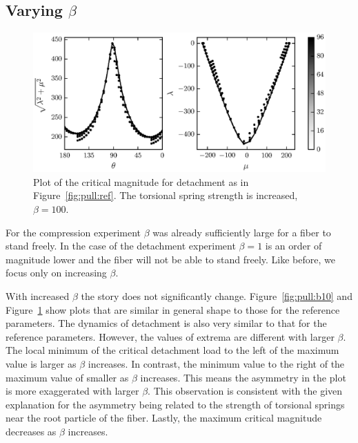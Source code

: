 \subsection{Varying $\beta$}

   \begin{figure}[t]
      \begin{center}
         \includegraphics{./fig/ch3/pull/b100/grid.eps}
      \end{center}      
      \caption{Plot of the critical magnitude for detachment as in Figure~\ref{fig:pull:ref}. The torsional spring strength is increased, $\beta=100$.
      \label{fig:pull:b100}}
   \end{figure}

For the compression experiment $\beta$ was already sufficiently large for a fiber to stand freely. In the case of the detachment experiment $\beta=1$ is an order of magnitude lower and the fiber will not be able to stand freely. Like before, we focus only on increasing $\beta$.

With increased $\beta$ the story does not significantly change. Figure~\ref{fig:pull:b10} and Figure~\ref{fig:pull:b100} show plots that are similar in general shape to those for the reference parameters. The dynamics of detachment is also very similar to that for the reference parameters. However, the values of extrema are different with larger $\beta$. The local minimum of the critical detachment load to the left of the maximum value is larger as $\beta$ increases. In contrast, the minimum value to the right of the maximum value of smaller as $\beta$ increases. This means the asymmetry in the plot is more exaggerated with larger $\beta$. This observation is consistent with the given explanation for the asymmetry being related to the strength of torsional springs near the root particle of the fiber. Lastly, the maximum critical magnitude decreases as $\beta$ increases.

